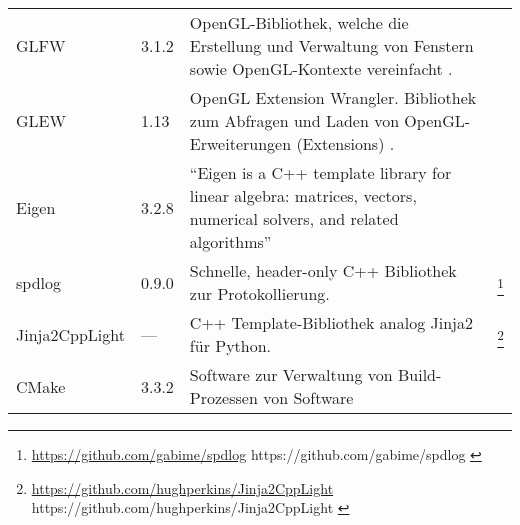 \begin{longtabu}{p{0.2\textwidth}p{0.1\textwidth}p{0.6\textwidth}p{0.1\textwidth}}
    GLFW       & 3.1.2   & OpenGL-Bibliothek, welche die Erstellung und
                           Verwaltung von Fenstern sowie OpenGL-Kontexte
                           vereinfacht
                           \parencite{wikipedia_the_free_encyclopedia_glfw_2015}.
                           &\protect\footnotemark{}\\

    GLEW       & 1.13    & OpenGL Extension Wrangler. Bibliothek zum Abfragen
                           und Laden von OpenGL-Erweiterungen (Extensions)
                           \parencite{wikipedia_the_free_encyclopedia_opengl_2015-1}.  %
                           &\protect\footnotemark{}\\

    Eigen      & 3.2.8   & ``Eigen is a C++ template library for linear
                            algebra: matrices, vectors, numerical solvers, and
                            related algorithms''\parencite{benoit_jacob_eigen_2016}
                           &\protect\footnotemark{}\\

    spdlog     & 0.9.0   & Schnelle, header-only C++
                           Bibliothek zur Protokollierung.
                           &\footnote{
                               \url{https://github.com/gabime/spdlog}{%
                                   https://github.com/gabime/spdlog
                                }
                            }\\

    Jinja2CppLight & --- & C++ Template-Bibliothek analog
                            Jinja2 für Python.
                           &\footnote{
                               \url{https://github.com/hughperkins/Jinja2CppLight}{%
                                   https://github.com/hughperkins/Jinja2CppLight
                                }
                            }\\

    CMake      & 3.3.2   & Software zur Verwaltung von Build-Prozessen von 
                           Software
                           &\protect\footnotemark{}\\


\end{longtabu}
